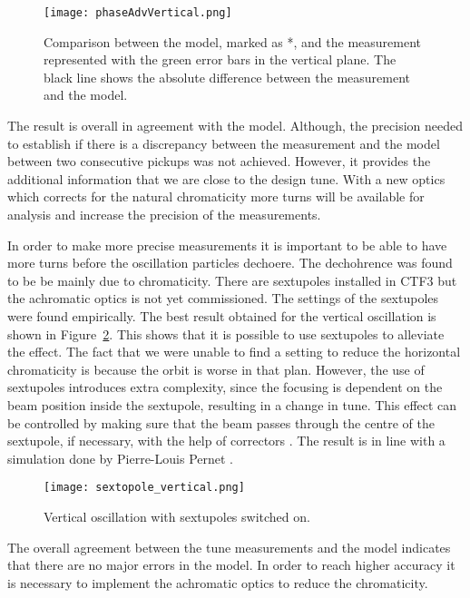 \begin{figure}[!h]
\centering
\texttt{[image: phaseAdvVertical.png]}
\caption[Phase advance in the vertical plane]{Comparison between the model, 
marked as *, and the measurement represented with the green error bars 
in the vertical plane. 
The black line shows the absolute difference between the measurement and 
the model.\label{fig:phaseAdvVertical}}
\end{figure}
 
The result is overall in agreement with the model. 
Although, the precision needed to establish if there is a discrepancy 
between the measurement and the model between two consecutive pickups was not achieved. 
However, it provides the additional information that we are close to the design tune. 
With a new optics which corrects for the natural chromaticity more turns will be available
for analysis and increase the precision of the measurements.
 
In order to make more precise measurements it is important 
to be able to have more turns before the oscillation particles dechoere. 
The dechohrence was found to be be mainly due to chromaticity. 
There are sextupoles installed in CTF3 but the achromatic optics is not yet commissioned.
The settings of the sextupoles were found empirically. 
The best result obtained for the vertical oscillation is shown in 
Figure~\ref{fig:tune:sextopole_vertical}. 
This shows that it is possible to use sextupoles to alleviate the effect. 
The fact that we were unable to find a setting to reduce 
the horizontal chromaticity is because the orbit is worse in that plan. 
However, the use of sextupoles introduces extra complexity, 
since the focusing is dependent on the beam position inside the sextupole, 
resulting in a change in tune. 
This effect can be controlled by making sure that the beam passes through the centre of 
the sextupole, if necessary, with the help of correctors \cite{Minty_Zimmermann_Book}. 
The result is in line with a simulation done by Pierre-Louis Pernet \cite{pierre:tune}.    
 
\begin{figure}[!h]
\centering
\texttt{[image: sextopole\_vertical.png]}
\caption{Vertical oscillation with sextupoles switched on.  \label{fig:tune:sextopole_vertical}}
\end{figure}
 

The overall agreement between the tune measurements and 
the model indicates that there are no major errors in the model. 
In order to reach higher accuracy it is necessary to implement 
the achromatic optics to reduce the chromaticity.
 
